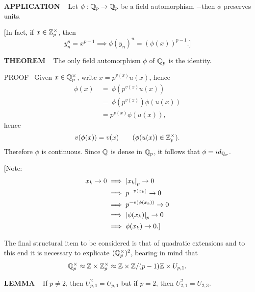 \vspace{0.1cm}


\begin{x}{\small\bf APPLICATION} \ %
Let $\phi: \mathbb{Q}_p \rightarrow \mathbb{Q}_p$ be a field automorphism $-$then $\phi$ preserves units.

\vspace{0.1cm}

[In fact, if $x \in  \mathbb{Z}_p^\times$, then
\[
y_n^n = x^{p-1} \implies \phi(y_n)^n = (\phi(x))^{p-1}.]
\]
\end{x}
\vspace{0.1cm}

\begin{x}{\small\bf THEOREM} \ %
The only field automorphism $\phi$ of $\mathbb{Q}_p$ is the identity.

\indent PROOF \  
Given $x \in \mathbb{Q}_p^\times$, write $x = p^{v(x)}u(x)$, hence
\[
\begin{aligned}
\phi(x)  \ 
&= \  \phi(p^{v(x)}u(x))\\
&= \ \phi(p^{v(x)})\phi(u(x)) \\
&=   p^{v(x)} \phi(u(x)),
\end{aligned}
\]
hence
\[
v(\phi(x)) = v(x)			\qquad (\phi(u(x)) \in \mathbb{Z}_p^\times).
\]
Therefore $\phi$ is continuous.  
Since $\mathbb{Q}$ is dense in $\mathbb{Q}_p$, it follows that $\phi = id_{\mathbb{Q}_p}$.
\end{x}
\vspace{0.01cm}

[Note: 
\[
\begin{aligned}
x_k \rightarrow 0 
&\implies \left\vert x_k\right\vert_p \rightarrow 0 \\
&\implies p^{-v(x_k)} \rightarrow 0\\
&\implies p^{-v(\phi(x_k))} \rightarrow 0 \\
&\implies \left\vert\phi(x_k)\right\vert_p \rightarrow 0 \\
&\implies \phi(x_k) \rightarrow 0.]
\end{aligned}
\]

\indent The final structural item to be considered is that of quadratic extensions and to this end it is necessary to explicate $(\mathbb{Q}_p^\times)^2$, bearing in mind that
\[
\mathbb{Q}_p^\times \approx \mathbb{Z} \times \mathbb{Z}_p^\times \approx \mathbb{Z} \times \mathbb{Z} / (p-1)\mathbb{Z} \times U_{p,1}.
\]
\begin{x}{\small\bf LEMMA} \ %
If $p \ne 2$, then $U_{p,1}^2 = U_{p,1}$ but if $p = 2$, then $U_{2,1}^2 = U_{2,3}$.
\end{x}

